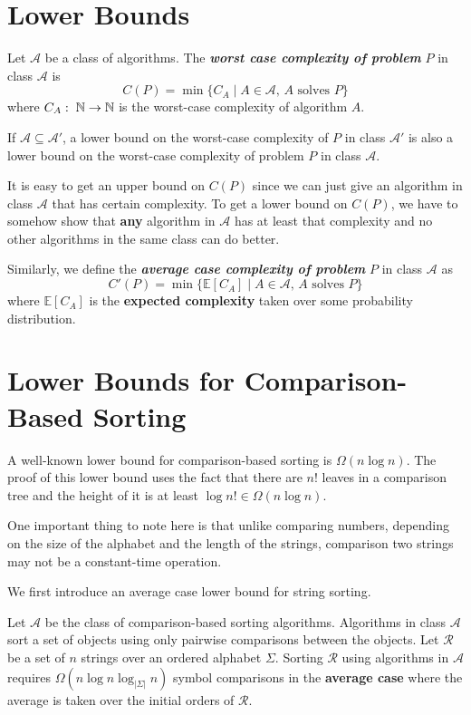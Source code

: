 \section{Lower Bounds}

Let $\mathcal{A}$ be a class of algorithms. The \textit{\textbf{worst case complexity of problem}} $P$ in class $\mathcal{A}$ is
$$
C(P) = \min\{ C_A \mid \text{$A \in \mathcal{A}$, $A$ solves $P$}\}
$$
where $C_A:\; \mathbb{N} \to \mathbb{N}$ is the worst-case complexity of algorithm $A$.

If $\mathcal{A} \subseteq \mathcal{A}'$, a lower bound on the worst-case complexity of $P$ in class $\mathcal{A}'$ is also a lower bound on the worst-case complexity of problem $P$ in class $\mathcal{A}$.

It is easy to get an upper bound on $C(P)$ since we can just give an algorithm in class $\mathcal{A}$ that has certain complexity. To get a lower bound on $C(P)$, we have to somehow show that \textbf{any} algorithm in $\mathcal{A}$ has at least that complexity and no other algorithms in the same class can do better.

Similarly, we define the \textit{\textbf{average case complexity of problem}} $P$ in class $\mathcal{A}$ as
$$
C'(P) = \min\{\mathbb{E}[C_A] \mid \text{$A \in \mathcal{A}$, $A$ solves $P$}\}
$$
where $\mathbb{E}[C_A]$ is the \textbf{expected complexity} taken over some probability distribution.

\section{Lower Bounds for Comparison-Based Sorting}

A well-known lower bound for comparison-based sorting is $\Omega(n \log n)$. The proof of this lower bound uses the fact that there are $n!$ leaves in a comparison tree and the height of it is at least $\log n! \in \Omega(n \log n)$.

One important thing to note here is that unlike comparing numbers, depending on the size of the alphabet and the length of the strings, comparison two strings may not be a constant-time operation.

We first introduce an average case lower bound for string sorting.

\begin{theorem}
    Let $\mathcal{A}$ be the class of comparison-based sorting algorithms. Algorithms in class $\mathcal{A}$ sort a set of objects using only pairwise comparisons between the objects. Let $\mathcal{R}$ be a set of $n$ strings over an ordered alphabet $\Sigma$. Sorting $\mathcal{R}$ using algorithms in $\mathcal{A}$ requires $\Omega(n \log n \log_{|\Sigma|} n)$ symbol comparisons in the \textbf{average case} where the average is taken over the initial orders of $\mathcal{R}$.
\end{theorem}

